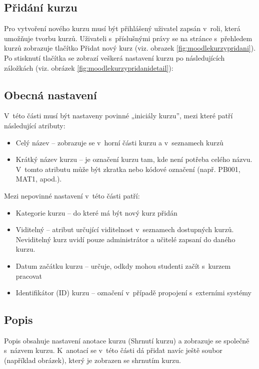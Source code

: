 \documentclass[
print,
  11pt,
  table,   
  nolof,    
  nolot,
  oneside,
  draft
]{fithesis3}
\begin{document}
\subsection*{Přidání kurzu}
Pro vytvoření nového kurzu musí být přihlášený uživatel zapsán v~roli, kte\-rá umožňuje tvorbu kurzů. Uživateli s~příslušnými právy se na stránce s~přehledem kurzů zobrazuje tlačítko Přidat nový kurz (viz. obrazek \ref{fig:moodlekurzypridani}). Po stisknutí tlačítka se zobrazí veškerá nastavení kurzu po následujících záložkách (viz. obrázek \ref{fig:moodlekurzypridanidetail}):
 

\subsection*{Obecná nastavení}
V~této části musí být nastaveny povinné „iniciály kurzu”, mezi které patří následující atributy:
\begin{itemize}
	\item Celý název -- zobrazuje se v~horní části kurzu a v~seznamech kurzů
	\item Krátký název kurzu -- je označení kurzu tam, kde není potřeba celého názvu. V~tomto atributu může být zkratka nebo kódové označení (např. PB001, MAT1, apod.).
\end{itemize}
Mezi nepovinné nastavení v~této části patří:
\begin{itemize}
	\item Kategorie kurzu -- do které má být nový kurz přidán
	\item Viditelný -- atribut určující viditelnost v~seznamech dostupných kur\-zů. Neviditelný kurz uvidí pouze administrátor a učitelé zapsaní do daného kurzu.
	\item Datum začátku kurzu -- určuje, odkdy mohou studenti začít s~kurzem pracovat
	\item Identifikátor (ID) kurzu -- označení v~případě propojení s~externími systémy
\end{itemize}
\subsection*{Popis}
Popis obsahuje nastavení anotace kurzu (Shrnutí kurzu) a zobrazuje se společně s~názvem kurzu. K~anotací se v~této části dá přidat navíc ještě soubor (například obrázek), který je zobrazen se shrnutím kurzu.
\end{document}
